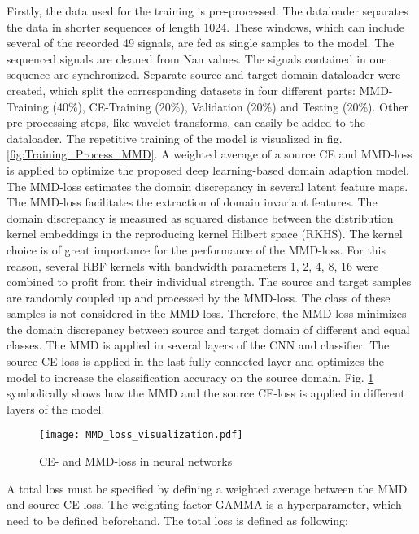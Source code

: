 Firstly, the data used for the training is pre-processed. The dataloader separates the data in shorter sequences of length 1024. These windows, which can include several of the recorded 49 signals, are fed as single samples to the model. The sequenced signals are cleaned from Nan values. The signals contained in one sequence are synchronized. Separate source and target domain dataloader were created, which split the corresponding datasets in four different parts: MMD-Training (40\%), CE-Training (20\%), Validation (20\%) and Testing (20\%). Other pre-processing steps, like wavelet transforms, can easily be added to the dataloader. The repetitive training of the model is visualized in fig. \ref{fig:Training_Process_MMD}. A weighted average of a source CE and MMD-loss is applied to optimize the proposed deep learning-based domain adaption model. The MMD-loss estimates the domain discrepancy in several latent feature maps. The MMD-loss facilitates the extraction of domain invariant features. The domain discrepancy is measured as squared distance between the distribution kernel embeddings in the reproducing kernel Hilbert space (RKHS). The kernel choice is of great importance for the performance of the MMD-loss. For this reason, several RBF kernels with bandwidth parameters 1, 2, 4, 8, 16 were combined to profit from their individual strength. The source and target samples are randomly coupled up and processed by the MMD-loss. The class of these samples is not considered in the MMD-loss. Therefore, the MMD-loss minimizes the domain discrepancy between source and target domain of different and equal classes. The MMD is applied in several layers of the CNN and classifier. The source CE-loss is applied in the last fully connected layer and optimizes the model to increase the classification accuracy on the source domain. Fig. \ref{fig:MMD_Loss_and_CE_loss} symbolically shows how the MMD and the source CE-loss is applied in different layers of the model.



\begin{figure}[H]
  \centering
  \texttt{[image: MMD\_loss\_visualization.pdf]}
  \caption {CE- and MMD-loss in neural networks} \label{fig:MMD_Loss_and_CE_loss}
\end{figure}
 
A total loss must be specified by defining a weighted average between the MMD and source CE-loss. The weighting factor GAMMA is a hyperparameter, which need to be defined beforehand. The total loss is defined as following:

